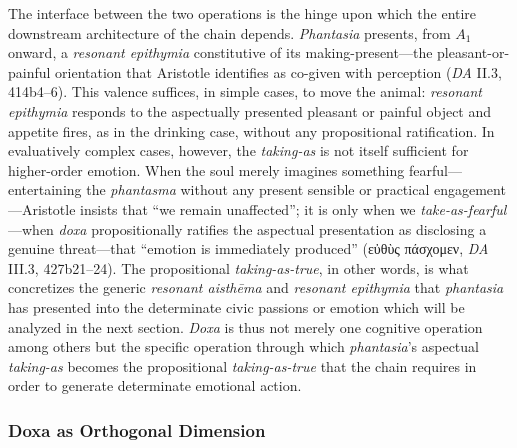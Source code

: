 \documentclass{article}
\newcommand{\gk}[1]{{\greekfont #1}}
\begin{document}
The interface between the two operations is the hinge upon which the entire downstream architecture of the chain depends. \textit{Phantasia} presents, from $A_1$ onward, a \textit{resonant epithymia} constitutive of its making-present---the pleasant-or-painful orientation that Aristotle identifies as co-given with perception (\textit{DA} II.3, 414b4--6). This valence suffices, in simple cases, to move the animal: \textit{resonant epithymia} responds to the aspectually presented pleasant or painful object and appetite fires, as in the drinking case, without any propositional ratification. In evaluatively complex cases, however, the \textit{taking-as} is not itself sufficient for higher-order emotion. When the soul merely imagines something fearful---entertaining the \textit{phantasma} without any present sensible or practical engagement---Aristotle insists that ``we remain unaffected''; it is only when we \textit{take-as-fearful}---when \textit{doxa} propositionally ratifies the aspectual presentation as disclosing a genuine threat---that ``emotion is immediately produced'' (\gk{εὐθὺς πάσχομεν}, \textit{DA} III.3, 427b21--24). The propositional \textit{taking-as-true}, in other words, is what concretizes the generic \textit{resonant aisthēma} and \textit{resonant epithymia} that \textit{phantasia} has presented into the determinate civic passions or emotion which will be analyzed in the next section. \textit{Doxa} is thus not merely one cognitive operation among others but the specific operation through which \textit{phantasia}'s aspectual \textit{taking-as} becomes the propositional \textit{taking-as-true} that the chain requires in order to generate determinate emotional action.

\subsubsection*{Doxa as Orthogonal Dimension}
\end{document}

